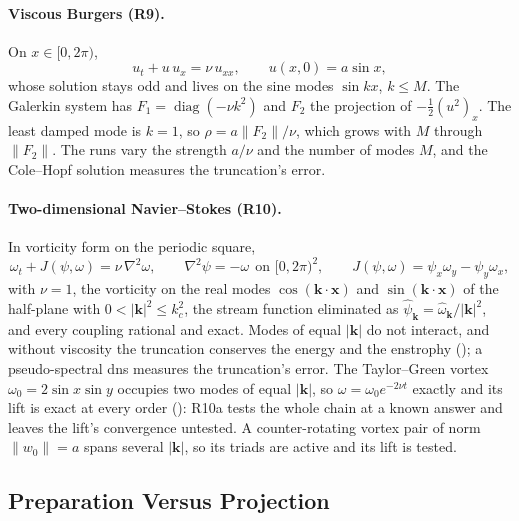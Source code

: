 \paragraph{Viscous Burgers (R9).} On $x\in[0,2\pi)$,
\begin{equation}
    u_t+u\,u_x=\nu\,u_{xx},\qquad u(x,0)=a\sin x,
    \label{eq:burgers}
\end{equation}
whose solution stays odd and lives on the sine modes $\sin kx$, $k\le M$. The Galerkin system has $F_1=\operatorname{diag}(-\nu k^2)$ and $F_2$ the projection of $-\tfrac12(u^2)_x$. The least damped mode is $k=1$, so $\rho=a\|F_2\|/\nu$, which grows with $M$ through $\|F_2\|$. The runs vary the strength $a/\nu$ and the number of modes $M$, and the Cole--Hopf solution \cite{hopf1950burgers,cole1951burgers} measures the truncation's error.

\paragraph{Two-dimensional Navier--Stokes (R10).} In vorticity form on the periodic square,
\begin{equation}
    \omega_t+J(\psi,\omega)=\nu\,\nabla^2\omega,
    \qquad
    \nabla^2\psi=-\omega\ \ \text{on }[0,2\pi)^2,
    \qquad
    J(\psi,\omega)=\psi_x\omega_y-\psi_y\omega_x,
    \label{eq:navier-stokes}
\end{equation}
with $\nu=1$, the vorticity on the real modes $\cos(\mathbf k\cdot\mathbf x)$ and $\sin(\mathbf k\cdot\mathbf x)$ of the half-plane with $0<|\mathbf k|^2\le k_c^2$, the stream function eliminated as $\hat\psi_{\mathbf k}=\hat\omega_{\mathbf k}/|\mathbf k|^2$, and every coupling rational and exact. Modes of equal $|\mathbf k|$ do not interact, and without viscosity the truncation conserves the energy and the enstrophy (); a pseudo-spectral \gls{dns} measures the truncation's error. The Taylor--Green vortex $\omega_0=2\sin x\sin y$ \cite{taylorgreen1937} occupies two modes of equal $|\mathbf k|$, so $\omega=\omega_0e^{-2\nu t}$ exactly and its lift is exact at every order (): R10a tests the whole chain at a known answer and leaves the lift's convergence untested. A counter-rotating vortex pair of norm $\|w_0\|=a$ spans several $|\mathbf k|$, so its triads are active and its lift is tested.

\subsection{Preparation Versus Projection}
\label{sec:prep-vs-proj}

